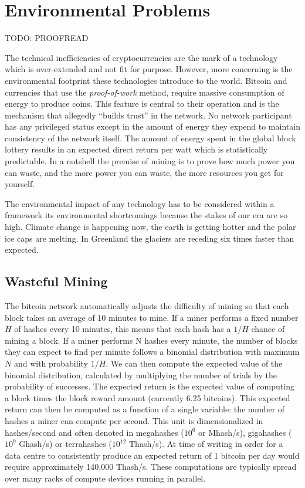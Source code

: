 \chapter{Environmental Problems}

TODO: PROOFREAD

The technical inefficiencies of cryptocurrencies are the mark of a technology
which is over-extended and not fit for purpose. However, more concerning is the
environmental footprint these technologies introduce to the world. Bitcoin and
currencies that use the \textit{proof-of-work} method, require massive
consumption of energy to produce coins. This feature is central to their
operation and is the mechanism that allegedly ``builds trust'' in the network.
No network participant has any privileged status except in the amount of energy
they expend to maintain consistency of the network itself. The amount of energy
spent in the global block lottery results in an expected direct return per watt
which is statistically predictable. In a nutshell the premise of mining is to
prove how much power you can waste, and the more power you can waste, the more
resources you get for yourself. \cite{gerard_attack_2017}

The environmental impact of any technology has to be considered within a
framework its environmental shortcomings because the stakes of our era are so
high. Climate change is happening now, the earth is getting hotter and the polar
ice caps are melting. In Greenland the glaciers are receding six times faster
than expected.

\section{Wasteful Mining}

The bitcoin network automatically adjusts the difficulty of mining so that each
block takes an average of 10 minutes to mine. If a miner performs a fixed number
$H$ of hashes every 10 minutes, this means that each hash has a $1/H$ chance of
mining a block. If a miner performs N hashes every minute, the number of blocks
they can expect to find per minute follows a binomial distribution with maximum
$N$ and with probability $1/H$. We can then compute the expected value of the
binomial distribution, calculated by multiplying the number of trials by the
probability of successes. The expected return is the expected value of computing
a block times the block reward amount (currently 6.25 bitcoins). This expected
return can then be computed as a function of a single variable: the number of
hashes a miner can compute per second.  This unit is dimensionalized in
hashes/second and often denoted in megahashes ($10^6$ or Mhash/s), gigahashes
($10^9$ Ghash/s) or terrahashes ($10^{12}$ Thash/s). At time of writing in order
for a data centre to consistently produce an expected return of 1 bitcoin per
day would require approximately 140,000 Thash/s.  These computations are
typically spread over many racks of compute devices running in parallel.

